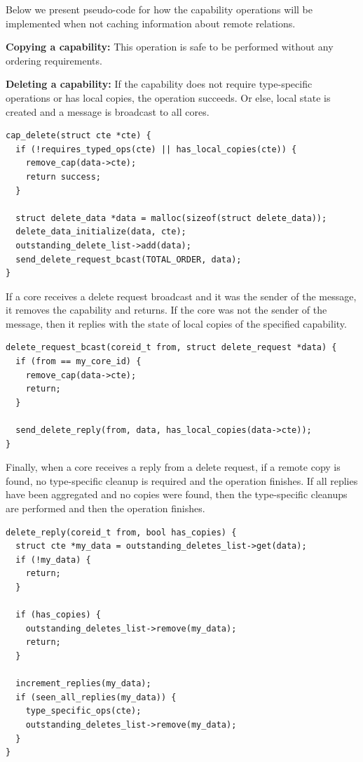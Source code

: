 \documentclass[a4paper,twoside]{report} %
\begin{document}
Below we present pseudo-code for how the capability operations will be
implemented when not caching information about remote relations.

\textbf{Copying a capability:} This operation is safe to be performed
without any ordering requirements.

\textbf{Deleting a capability:} If the capability does not require
type-specific operations or has local copies, the operation succeeds.
Or else, local state is created and a message is broadcast to all
cores.

\begin{verbatim}
cap_delete(struct cte *cte) {
  if (!requires_typed_ops(cte) || has_local_copies(cte)) {
    remove_cap(data->cte);
    return success;
  }

  struct delete_data *data = malloc(sizeof(struct delete_data));
  delete_data_initialize(data, cte);
  outstanding_delete_list->add(data);
  send_delete_request_bcast(TOTAL_ORDER, data);
}
\end{verbatim}

If a core receives a delete request broadcast and it was the sender of
the message, it removes the capability and returns. If the core was
not the sender of the message, then it replies with the state of local
copies of the specified capability.

\begin{verbatim}
delete_request_bcast(coreid_t from, struct delete_request *data) {
  if (from == my_core_id) {
    remove_cap(data->cte);
    return;
  }

  send_delete_reply(from, data, has_local_copies(data->cte));
}
\end{verbatim}

Finally, when a core receives a reply from a delete request, if a
remote copy is found, no type-specific cleanup is required and the
operation finishes. If all replies have been aggregated and no copies
were found, then the type-specific cleanups are performed and then the
operation finishes.

\begin{verbatim}
delete_reply(coreid_t from, bool has_copies) {
  struct cte *my_data = outstanding_deletes_list->get(data);
  if (!my_data) {
    return;
  }

  if (has_copies) {
    outstanding_deletes_list->remove(my_data);
    return;
  }

  increment_replies(my_data);
  if (seen_all_replies(my_data)) {
    type_specific_ops(cte);
    outstanding_deletes_list->remove(my_data);
  }
}
\end{verbatim}
\end{document}
